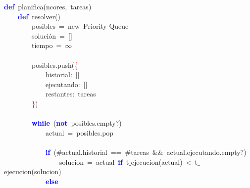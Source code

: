 \noindent
\mbox{}\textbf{\textcolor{Blue}{def}}\ planifica\textcolor{BrickRed}{(}ncores\textcolor{BrickRed}{,}\ tareas\textcolor{BrickRed}{)} \\
\mbox{}\ \ \ \ \textbf{\textcolor{Blue}{def}}\ resolver\textcolor{BrickRed}{()} \\
\mbox{}\ \ \ \ \ \ \ \ posibles\ \textcolor{BrickRed}{=}\ new\ Priority Queue \\
\mbox{}\ \ \ \ \ \ \ \ solución\ \textcolor{BrickRed}{=}\ \textcolor{BrickRed}{[]} \\
\mbox{}\ \ \ \ \ \ \ \ tiempo\ \textcolor{BrickRed}{=}\ $\infty$ \\
\mbox{} \\
\mbox{}\ \ \ \ \ \ \ \ posibles\textcolor{BrickRed}{.}push\textcolor{BrickRed}{(}\textcolor{Red}{\{} \\
\mbox{}\ \ \ \ \ \ \ \ \ \ \ \ historial\textcolor{BrickRed}{:}\ \textcolor{BrickRed}{[]} \\
\mbox{}\ \ \ \ \ \ \ \ \ \ \ \ ejecutando\textcolor{BrickRed}{:}\ \textcolor{BrickRed}{[]} \\
\mbox{}\ \ \ \ \ \ \ \ \ \ \ \ restantes\textcolor{BrickRed}{:}\ tareas \\
\mbox{}\ \ \ \ \ \ \ \ \textcolor{Red}{\}}\textcolor{BrickRed}{)} \\
\mbox{} \\
\mbox{}\ \ \ \ \ \ \ \ \textbf{\textcolor{Blue}{while}}\ \textcolor{BrickRed}{(}\textbf{\textcolor{Blue}{not}}\ posibles\textcolor{BrickRed}{.}empty?\textcolor{BrickRed}{)} \\
\mbox{}\ \ \ \ \ \ \ \ \ \ \ \ actual\ \textcolor{BrickRed}{=}\ posibles\textcolor{BrickRed}{.}pop \\
\mbox{} \\
\mbox{}\ \ \ \ \ \ \ \ \ \ \ \ \textbf{\textcolor{Blue}{if}}\ \textcolor{BrickRed}{(}\#actual\textcolor{BrickRed}{.}historial\ \textcolor{BrickRed}{==}\ \#tareas\ \textcolor{BrickRed}{\&\&}\ actual\textcolor{BrickRed}{.}ejecutando\textcolor{BrickRed}{.}empty?\textcolor{BrickRed}{)} \\
\mbox{}\ \ \ \ \ \ \ \ \ \ \ \ \ \ \ \ solucion\ \textcolor{BrickRed}{=}\ actual\ \textbf{\textcolor{Blue}{if}}\ t$\_$ejecucion\textcolor{BrickRed}{(}actual\textcolor{BrickRed}{)}\ \textcolor{BrickRed}{\textless{}}\ t$\_$ejecucion\textcolor{BrickRed}{(}solucion\textcolor{BrickRed}{)} \\
\mbox{}\ \ \ \ \ \ \ \ \ \ \ \ \textbf{\textcolor{Blue}{else}} \\
